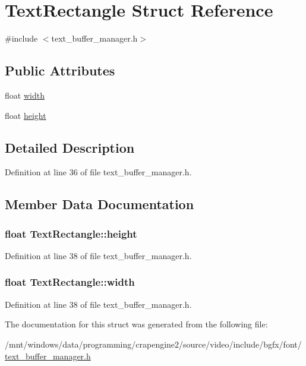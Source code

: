 \hypertarget{struct_text_rectangle}{\section{Text\+Rectangle Struct Reference}
\label{struct_text_rectangle}
}


{\ttfamily \#include $<$text\+\_\+buffer\+\_\+manager.\+h$>$}

\subsection*{Public Attributes}
\begin{DoxyCompactItemize}
\item 
float \hyperlink{struct_text_rectangle_a301e23646ba32285edf4c9ee4898ec25}{width}
\item 
float \hyperlink{struct_text_rectangle_ae61e58b9171a07e2191470938cb02f46}{height}
\end{DoxyCompactItemize}


\subsection{Detailed Description}


Definition at line 36 of file text\+\_\+buffer\+\_\+manager.\+h.



\subsection{Member Data Documentation}
\hypertarget{struct_text_rectangle_ae61e58b9171a07e2191470938cb02f46}{
\subsubsection[{height}]{\setlength{\rightskip}{0pt plus 5cm}float Text\+Rectangle\+::height}}\label{struct_text_rectangle_ae61e58b9171a07e2191470938cb02f46}


Definition at line 38 of file text\+\_\+buffer\+\_\+manager.\+h.

\hypertarget{struct_text_rectangle_a301e23646ba32285edf4c9ee4898ec25}{
\subsubsection[{width}]{\setlength{\rightskip}{0pt plus 5cm}float Text\+Rectangle\+::width}}\label{struct_text_rectangle_a301e23646ba32285edf4c9ee4898ec25}


Definition at line 38 of file text\+\_\+buffer\+\_\+manager.\+h.



The documentation for this struct was generated from the following file\+:\begin{DoxyCompactItemize}
\item 
/mnt/windows/data/programming/crapengine2/source/video/include/bgfx/font/\hyperlink{text__buffer__manager_8h}{text\+\_\+buffer\+\_\+manager.\+h}\end{DoxyCompactItemize}
